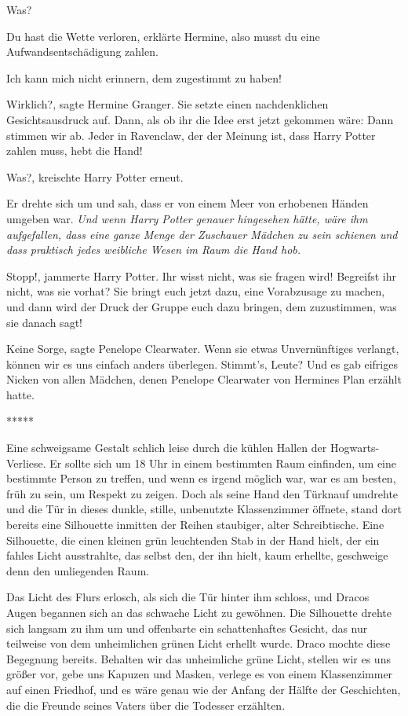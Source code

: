 \glqq{}Was?\grqq{}

\glqq{}Du hast die Wette verloren\grqq{}, erklärte Hermine, \glqq{}also musst du
eine Aufwandsentschädigung zahlen.\grqq{}

\glqq{}Ich kann mich nicht erinnern, dem zugestimmt zu haben!\grqq{}

\glqq{}Wirklich?\grqq{}, sagte Hermine Granger. Sie setzte einen nachdenklichen
Gesichtsausdruck auf. Dann, als ob ihr die Idee erst jetzt gekommen wäre: \glqq
Dann stimmen wir ab. Jeder in Ravenclaw, der der Meinung ist, dass Harry Potter
zahlen muss, hebt die Hand!\grqq{}

\glqq{}Was?\grqq{}, kreischte Harry Potter erneut.

Er drehte sich um und sah, dass er von einem Meer von erhobenen Händen umgeben
war. \emph{Und wenn Harry Potter genauer hingesehen hätte, wäre ihm aufgefallen,
dass eine ganze Menge der Zuschauer Mädchen zu sein schienen und dass praktisch
jedes weibliche Wesen im Raum die Hand hob.}

\glqq{}Stopp!\grqq{}, jammerte Harry Potter. \glqq{}Ihr wisst nicht, was sie
fragen wird! Begreifst ihr nicht, was sie vorhat? Sie bringt euch jetzt dazu,
eine Vorabzusage zu machen, und dann wird der Druck der Gruppe euch dazu
bringen, dem zuzustimmen, was sie danach sagt!\grqq{}

\glqq{}Keine Sorge\grqq{}, sagte Penelope Clearwater. \glqq{}Wenn sie etwas
Unvernünftiges verlangt, können wir es uns einfach anders überlegen. Stimmt's,
Leute?\grqq{} Und es gab eifriges Nicken von allen Mädchen, denen Penelope
Clearwater von Hermines Plan erzählt hatte.

\begin{center}*****\end{center}

Eine schweigsame Gestalt schlich leise durch die kühlen Hallen der
Hogwarts-Verliese. Er sollte sich um 18 Uhr in einem bestimmten Raum einfinden,
um eine bestimmte Person zu treffen, und wenn es irgend möglich war, war es am
besten, früh zu sein, um Respekt zu zeigen. Doch als seine Hand den Türknauf
umdrehte und die Tür in dieses dunkle, stille, unbenutzte Klassenzimmer öffnete,
stand dort bereits eine Silhouette inmitten der Reihen staubiger, alter
Schreibtische. Eine Silhouette, die einen kleinen grün leuchtenden Stab in der
Hand hielt, der ein fahles Licht ausstrahlte, das selbst den, der ihn hielt,
kaum erhellte, geschweige denn den umliegenden Raum.

Das Licht des Flurs erlosch, als sich die Tür hinter ihm schloss, und Dracos
Augen begannen sich an das schwache Licht zu gewöhnen. Die Silhouette drehte
sich langsam zu ihm um und offenbarte ein schattenhaftes Gesicht, das nur
teilweise von dem unheimlichen grünen Licht erhellt wurde. Draco mochte diese
Begegnung bereits. Behalten wir das unheimliche grüne Licht, stellen wir es uns
größer vor, gebe uns Kapuzen und Masken, verlege es von einem Klassenzimmer auf
einen Friedhof, und es wäre genau wie der Anfang der Hälfte der Geschichten, die
die Freunde seines Vaters über die Todesser erzählten.

